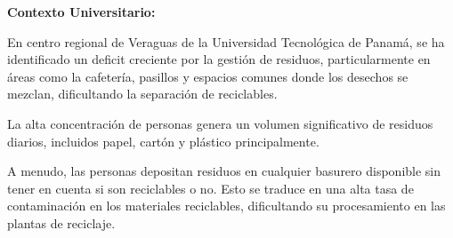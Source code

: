 \textbf{Contexto Universitario:}

En centro regional de Veraguas de la Universidad Tecnológica de Panamá, se ha identificado un deficit creciente por la gestión de residuos,
particularmente en áreas como la cafetería, pasillos y espacios comunes donde los desechos se mezclan, dificultando la separación de reciclables.

La alta concentración de personas genera un volumen significativo de residuos diarios, incluidos papel, cartón y plástico principalmente.

A menudo, las personas depositan residuos en cualquier basurero disponible sin tener en cuenta si son reciclables o no. Esto se traduce en una alta tasa de contaminación en los materiales reciclables, dificultando su procesamiento en las plantas de reciclaje.
